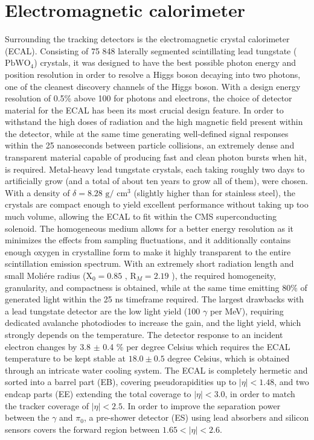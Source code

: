 \section{Electromagnetic calorimeter}
Surrounding the tracking detectors is the electromagnetic crystal calorimeter (ECAL). Consisting of 75 848 laterally segmented scintillating lead tungstate ($\textrm{PbWO}_4$) crystals, it was designed to have the best possible photon energy and position resolution in order to resolve a Higgs boson decaying into two photons, one of the cleanest discovery channels of the Higgs boson. 
With a design energy resolution of 0.5\% above 100 \GeV for photons and electrons, the choice of detector material for the ECAL has been its most crucial design feature. 
In order to withstand the high doses of radiation and the high magnetic field present within the detector, while at the same time generating well-defined signal responses within the 25 nanoseconds between particle collisions, an extremely dense and transparent material capable of producing fast and clean photon bursts when hit, is required. 
Metal-heavy lead tungstate crystals, each taking roughly two days to artificially grow (and a total of about ten years to grow all of them), were chosen. With a density of $\delta=8.28 \textrm{ g}/\textrm{ cm}^3$ (slightly higher than for stainless steel), the crystals are compact enough to yield excellent performance without taking up too much volume, allowing the ECAL to fit within the CMS superconducting solenoid. The homogeneous medium allows for a better energy resolution as it minimizes the effects from sampling fluctuations, and it additionally contains enough oxygen in crystalline form to make it highly transparent to the entire scintillation emission spectrum. With an extremely short radiation length and small Moliére radius ($\textrm{X}_0=0.85$ \cm, $\textrm{R}_M=2.19$ \cm), the required homogeneity, granularity, and compactness is obtained, while at the same time emitting 80\% of generated light within the 25 ns timeframe required. The largest drawbacks with a lead tungstate detector are the low light yield (100 $\gamma$ per MeV), requiring dedicated avalanche photodiodes to increase the gain, and the light yield, which strongly depends on the temperature. The detector response to an
incident electron changes by 3.8 $\pm$ 0.4 \% per degree Celsius which requires the ECAL temperature to be kept stable at $18.0 \pm 0.5$ degree Celsius, which is obtained through an intricate water cooling system.
The ECAL is completely hermetic and sorted into a barrel part (EB), covering pseudorapidities up to $|\eta|<1.48$, and two endcap parts (EE) extending the total coverage to $|\eta|<3.0$, in order to match the tracker coverage of $|\eta|<2.5$. In order to improve the separation power between the $\gamma$ and $\pi_0$, a pre-shower detector (ES) using lead absorbers and silicon sensors covers the forward region between $1.65<|\eta|<2.6$.
